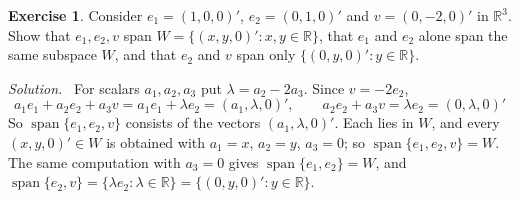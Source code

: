 \documentclass[12pt]{article}
\newcommand{\R}{\mathbb R}
\DeclareMathOperator{\Span}{span}
\theoremstyle{definition}
\newtheorem{exercise}{Exercise}
\newenvironment{solution}{\par\noindent\textit{Solution.}\ }{\par\smallskip}
\begin{document}
\begin{exercise}\label{r3-ex-same-span}
Consider \(e_1=(1,0,0)'\), \(e_2=(0,1,0)'\) and \(v=(0,-2,0)'\) in \(\R^3\). Show
that \(e_1,e_2,v\) span \(W=\{(x,y,0)':x,y\in\R\}\), that \(e_1\) and \(e_2\) alone span the
same subspace \(W\), and that \(e_2\) and \(v\) span only \(\{(0,y,0)':y\in\R\}\).
\end{exercise}
\begin{solution}
For scalars \(a_1,a_2,a_3\) put \(\lambda=a_2-2a_3\). Since \(v=-2e_2\),
\[
a_1e_1+a_2e_2+a_3v=a_1e_1+\lambda e_2=(a_1,\lambda,0)',\qquad
a_2e_2+a_3v=\lambda e_2=(0,\lambda,0)'
\]
So \(\Span\{e_1,e_2,v\}\) consists of the vectors \((a_1,\lambda,0)'\). Each lies in \(W\),
and every \((x,y,0)'\in W\) is obtained with \(a_1=x\), \(a_2=y\), \(a_3=0\); so
\(\Span\{e_1,e_2,v\}=W\). The same computation with \(a_3=0\) gives \(\Span\{e_1,e_2\}=W\), and
\(\Span\{e_2,v\}=\{\lambda e_2:\lambda\in\R\}=\{(0,y,0)':y\in\R\}\).
\end{solution}
\end{document}
